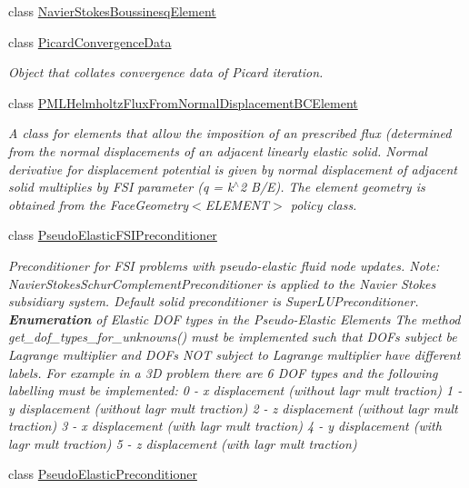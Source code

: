 \begin{DoxyCompactItemize}
class \hyperlink{classoomph_1_1NavierStokesBoussinesqElement}{Navier\+Stokes\+Boussinesq\+Element}
\item 
class \hyperlink{classoomph_1_1PicardConvergenceData}{Picard\+Convergence\+Data}
\begin{DoxyCompactList}\small\item\em Object that collates convergence data of Picard iteration. \end{DoxyCompactList}\item 
class \hyperlink{classoomph_1_1PMLHelmholtzFluxFromNormalDisplacementBCElement}{P\+M\+L\+Helmholtz\+Flux\+From\+Normal\+Displacement\+B\+C\+Element}
\begin{DoxyCompactList}\small\item\em A class for elements that allow the imposition of an prescribed flux (determined from the normal displacements of an adjacent linearly elastic solid. Normal derivative for displacement potential is given by normal displacement of adjacent solid multiplies by F\+SI parameter (q = k$^\wedge$2 B/E). The element geometry is obtained from the Face\+Geometry$<$\+E\+L\+E\+M\+E\+N\+T$>$ policy class. \end{DoxyCompactList}\item 
class \hyperlink{classoomph_1_1PseudoElasticFSIPreconditioner}{Pseudo\+Elastic\+F\+S\+I\+Preconditioner}
\begin{DoxyCompactList}\small\item\em Preconditioner for F\+SI problems with pseudo-\/elastic fluid node updates. Note\+: Navier\+Stokes\+Schur\+Complement\+Preconditioner is applied to the Navier Stokes subsidiary system. Default solid preconditioner is Super\+L\+U\+Preconditioner. {\bfseries Enumeration} of Elastic D\+OF types in the Pseudo-\/\+Elastic Elements The method get\+\_\+dof\+\_\+types\+\_\+for\+\_\+unknowns() must be implemented such that D\+O\+Fs subject be Lagrange multiplier and D\+O\+Fs N\+OT subject to Lagrange multiplier have different labels. For example in a 3D problem there are 6 D\+OF types and the following labelling must be implemented\+: 0 -\/ x displacement (without lagr mult traction) 1 -\/ y displacement (without lagr mult traction) 2 -\/ z displacement (without lagr mult traction) 3 -\/ x displacement (with lagr mult traction) 4 -\/ y displacement (with lagr mult traction) 5 -\/ z displacement (with lagr mult traction) \end{DoxyCompactList}\item 
class \hyperlink{classoomph_1_1PseudoElasticPreconditioner}{Pseudo\+Elastic\+Preconditioner}

\end{DoxyCompactItemize}
